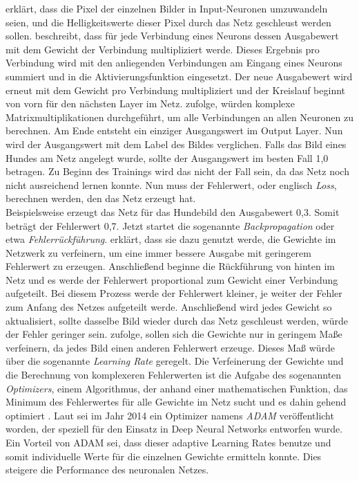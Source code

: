 \citet[136]{traiq_neuron} erklärt, dass die Pixel der einzelnen Bilder in Input-Neuronen umzuwandeln seien, und die Helligkeitswerte dieser Pixel durch das Netz geschleust werden sollen. \citet[S. 42]{traiq_neuron} beschreibt, dass für jede Verbindung eines Neurons dessen Ausgabewert mit dem Gewicht der Verbindung multipliziert werde. Dieses Ergebnis pro Verbindung wird mit den anliegenden Verbindungen am Eingang eines Neurons summiert und in die Aktivierungsfunktion eingesetzt. Der neue Ausgabewert wird erneut mit dem Gewicht pro Verbindung multipliziert und der Kreislauf beginnt von vorn für den nächsten Layer im Netz. \citet[S. 44]{traiq_neuron} zufolge, würden komplexe Matrixmultiplikationen durchgeführt, um alle Verbindungen an allen Neuronen zu berechnen. Am Ende entsteht ein einziger Ausgangswert im Output Layer. Nun wird der Ausgangswert mit dem Label des Bildes verglichen. Falls das Bild eines Hundes am Netz angelegt wurde, sollte der Ausgangswert im besten Fall 1,0 betragen. Zu Beginn des Trainings wird das nicht der Fall sein, da das Netz noch nicht ausreichend lernen konnte. Nun muss der Fehlerwert, oder englisch \textit{Loss}, berechnen werden, den das Netz erzeugt hat.\\

Beispielsweise erzeugt das Netz für das Hundebild den Ausgabewert 0,3. Somit beträgt der Fehlerwert 0,7. Jetzt startet die sogenannte \textit{Backpropagation} oder etwa \textit{Fehlerrückführung}. \citet[S. 59]{traiq_neuron} erklärt, dass sie dazu genutzt werde, die Gewichte im Netzwerk zu verfeinern, um eine immer bessere Ausgabe mit geringerem Fehlerwert zu erzeugen. Anschließend beginne die Rückführung von hinten im Netz und es werde der Fehlerwert proportional zum Gewicht einer Verbindung aufgeteilt. Bei diesem Prozess werde der Fehlerwert kleiner, je weiter der Fehler zum Anfang des Netzes aufgeteilt werde. Anschließend wird jedes Gewicht so aktualisiert, sollte dasselbe Bild wieder durch das Netz geschleust werden, würde der Fehler geringer sein. \citet[21]{traiq_neuron} zufolge, sollen sich die Gewichte nur in geringem Maße verfeinern, da jedes Bild einen anderen Fehlerwert erzeuge. Dieses Maß würde über die sogenannte \textit{Learning Rate} geregelt. Die Verfeinerung der Gewichte und die Berechnung von komplexeren Fehlerwerten ist die Aufgabe des sogenannten \textit{Optimizers}, einem Algorithmus, der anhand einer mathematischen Funktion, das Minimum des Fehlerwertes für alle Gewichte im Netz sucht und es dahin gehend optimiert \parencite[]{doshi-2019}. Laut \citet[]{bushaev-2018} sei im Jahr 2014 ein Optimizer namens \textit{ADAM} veröffentlicht worden, der speziell für den Einsatz in Deep Neural Networks entworfen wurde. Ein Vorteil von ADAM sei, dass dieser adaptive Learning Rates benutze und somit individuelle Werte für die einzelnen Gewichte ermitteln konnte. Dies steigere die Performance des neuronalen Netzes. \\


